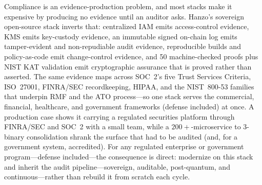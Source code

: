 \documentclass[11pt,letterpaper]{article}
\begin{document}
Compliance is an evidence-production problem, and most stacks make it expensive by
producing no evidence until an auditor asks. Hanzo's sovereign open-source stack
inverts that: centralized IAM emits access-control evidence, KMS emits key-custody
evidence, an immutable signed on-chain log emits tamper-evident and non-repudiable
audit evidence, reproducible builds and policy-as-code emit change-control evidence,
and 50 machine-checked proofs plus NIST KAT validation emit cryptographic assurance
that is proved rather than asserted. The same evidence maps across SOC~2's five Trust
Services Criteria, ISO~27001, FINRA/SEC recordkeeping, HIPAA, and the NIST~800-53
families that
underpin RMF and the ATO process---so one stack serves the commercial, financial,
healthcare, and government frameworks (defense included) at once. A production case
shows it carrying a regulated securities
platform through FINRA/SEC and SOC~2 with a small team, while a $200{+}$-microservice
to 3-binary consolidation shrank the surface that had to be audited (and, for a
government system, accredited).
For any regulated enterprise or government program---defense included---the
consequence is direct: modernize on this
stack and inherit the audit pipeline---sovereign, auditable, post-quantum, and
continuous---rather than rebuild it from scratch each cycle.
\end{document}
